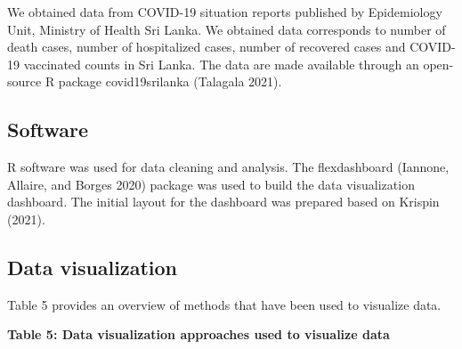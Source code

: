 \documentclass[
]{article}
\begin{document}
We obtained data from COVID-19 situation reports published by
Epidemiology Unit, Ministry of Health Sri Lanka. We obtained data
corresponds to number of death cases, number of hospitalized cases,
number of recovered cases and COVID-19 vaccinated counts in Sri Lanka.
The data are made available through an open-source R package
covid19srilanka (Talagala 2021).

\hypertarget{software}{%
\subsection{Software}\label{software}}

R software was used for data cleaning and analysis. The flexdashboard
(Iannone, Allaire, and Borges 2020) package was used to build the data
visualization dashboard. The initial layout for the dashboard was
prepared based on Krispin (2021).

\hypertarget{data-visualization}{%
\subsection{Data visualization}\label{data-visualization}}

Table 5 provides an overview of methods that have been used to visualize
data.

\textbf{Table 5: Data visualization approaches used to visualize data}
\end{document}
